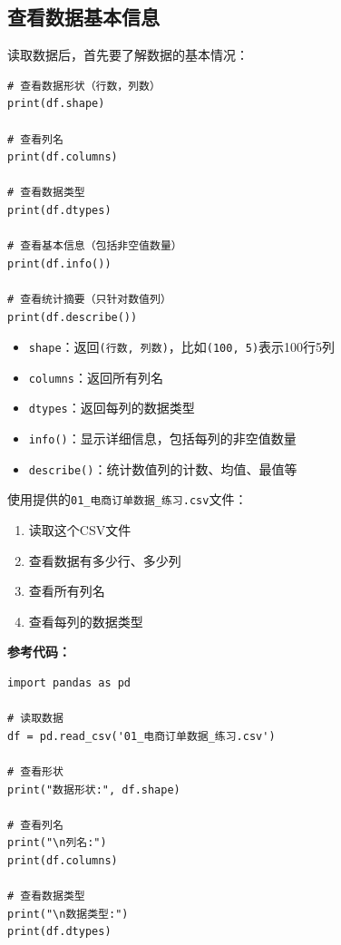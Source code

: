 \documentclass[12pt,a4paper]{article}
\begin{document}
\subsection{查看数据基本信息}

读取数据后，首先要了解数据的基本情况：

\begin{lstlisting}[caption={查看数据信息}]
# 查看数据形状（行数，列数）
print(df.shape)

# 查看列名
print(df.columns)

# 查看数据类型
print(df.dtypes)

# 查看基本信息（包括非空值数量）
print(df.info())

# 查看统计摘要（只针对数值列）
print(df.describe())
\end{lstlisting}

\begin{knowledgebox}
\begin{itemize}
    \item \texttt{shape}：返回\texttt{(行数, 列数)}，比如\texttt{(100, 5)}表示100行5列
    \item \texttt{columns}：返回所有列名
    \item \texttt{dtypes}：返回每列的数据类型
    \item \texttt{info()}：显示详细信息，包括每列的非空值数量
    \item \texttt{describe()}：统计数值列的计数、均值、最值等
\end{itemize}
\end{knowledgebox}

\begin{practicebox}[动手练习2]
使用提供的\texttt{01\_电商订单数据\_练习.csv}文件：

\begin{enumerate}
    \item 读取这个CSV文件
    \item 查看数据有多少行、多少列
    \item 查看所有列名
    \item 查看每列的数据类型
\end{enumerate}

\textbf{参考代码：}
\begin{lstlisting}
import pandas as pd

# 读取数据
df = pd.read_csv('01_电商订单数据_练习.csv')

# 查看形状
print("数据形状:", df.shape)

# 查看列名
print("\n列名:")
print(df.columns)

# 查看数据类型
print("\n数据类型:")
print(df.dtypes)
\end{lstlisting}
\end{practicebox}
\end{document}
